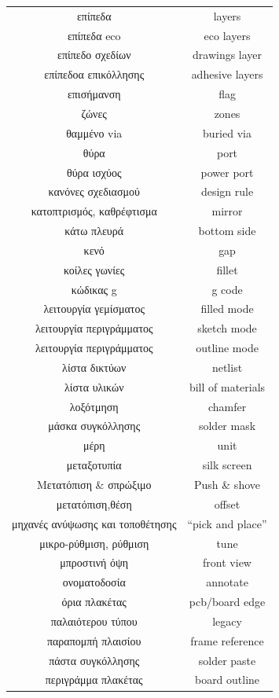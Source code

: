 \documentclass[a4paper]{article}
\begin{document}
\begin{longtabu}{ c c }
    επίπεδα	&	layers	\\
    επίπεδα eco	&	eco layers	\\
    επίπεδο σχεδίων	&	drawings layer	\\
    επίπεδοα επικόλλησης	&	adhesive layers	\\
    επισήμανση	&	flag	\\
    ζώνες	&	zones	\\
    θαμμένο via	&	buried via	\\
    θύρα	&	port	\\
    θύρα ισχύος	&	power port	\\
    κανόνες σχεδιασμού	&	design rule	\\
    κατοπτρισμός, καθρέφτισμα	&	mirror	\\
    κάτω πλευρά	&	bottom side	\\
    κενό	&	gap	\\
    κοίλες γωνίες	&	fillet	\\
    κώδικας g	&	g code	\\
    λειτουργία γεμίσματος	&	filled mode	\\
    λειτουργία περιγράμματος	&	sketch mode	\\
    λειτουργία περιγράμματος	&	outline mode	\\
    λίστα δικτύων	&	netlist	\\
    λίστα υλικών	&	bill of materials	\\
    λοξότμηση	&	chamfer	\\
    μάσκα συγκόλλησης	&	solder mask	\\
    μέρη	&	unit	\\
    μεταξοτυπία	&	silk screen	\\
    Μετατόπιση \& σπρώξιμο	&	Push \& shove	\\
    μετατόπιση,θέση	&	offset	\\
    μηχανές ανύψωσης και τοποθέτησης	&	“pick and place”	\\
    μικρο-ρύθμιση, ρύθμιση	&	tune	\\
    μπροστινή όψη	&	front view	\\
    ονοματοδοσία	&	annotate	\\
    όρια πλακέτας	&	pcb/board edge	\\
    παλαιότερου τύπου	&	legacy	\\
    παραπομπή πλαισίου	&	frame reference	\\
    πάστα συγκόλλησης	&	solder paste	\\
    περιγράμμα πλακέτας	&	board outline	\\

\end{longtabu}
\end{document}
